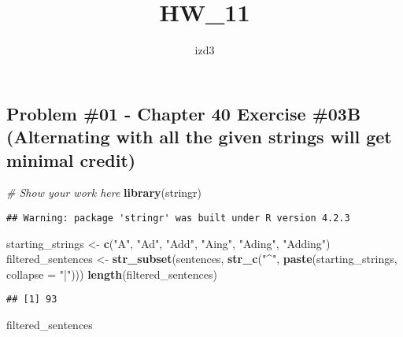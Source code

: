 \documentclass[
]{article}
\title{HW\_11}
\author{izd3}
\date{}
\newenvironment{Shaded}{\begin{snugshade}}{\end{snugshade}}
\newcommand{\AttributeTok}[1]{\textcolor[rgb]{0.13,0.29,0.53}{#1}}
\newcommand{\CommentTok}[1]{\textcolor[rgb]{0.56,0.35,0.01}{\textit{#1}}}
\newcommand{\FunctionTok}[1]{\textcolor[rgb]{0.13,0.29,0.53}{\textbf{#1}}}
\newcommand{\NormalTok}[1]{#1}
\newcommand{\OtherTok}[1]{\textcolor[rgb]{0.56,0.35,0.01}{#1}}
\newcommand{\StringTok}[1]{\textcolor[rgb]{0.31,0.60,0.02}{#1}}
\begin{document}
\maketitle

\newpage

\hypertarget{problem-01---chapter-40-exercise-03b-alternating-with-all-the-given-strings-will-get-minimal-credit}{%
\subsection{Problem \#01 - Chapter 40 Exercise \#03B (Alternating with
all the given strings will get minimal
credit)}\label{problem-01---chapter-40-exercise-03b-alternating-with-all-the-given-strings-will-get-minimal-credit}}

\begin{Shaded}
\begin{Highlighting}[]
\CommentTok{\# Show your work here}
\FunctionTok{library}\NormalTok{(stringr)}
\end{Highlighting}
\end{Shaded}

\begin{verbatim}
## Warning: package 'stringr' was built under R version 4.2.3
\end{verbatim}

\begin{Shaded}
\begin{Highlighting}[]
\NormalTok{starting\_strings }\OtherTok{\textless{}{-}} \FunctionTok{c}\NormalTok{(}\StringTok{"A"}\NormalTok{, }\StringTok{"Ad"}\NormalTok{, }\StringTok{"Add"}\NormalTok{, }\StringTok{"Aing"}\NormalTok{, }\StringTok{"Ading"}\NormalTok{, }\StringTok{"Adding"}\NormalTok{)}
\NormalTok{filtered\_sentences }\OtherTok{\textless{}{-}} \FunctionTok{str\_subset}\NormalTok{(sentences, }\FunctionTok{str\_c}\NormalTok{(}\StringTok{"\^{}"}\NormalTok{, }\FunctionTok{paste}\NormalTok{(starting\_strings, }\AttributeTok{collapse =} \StringTok{"|"}\NormalTok{)))}
\FunctionTok{length}\NormalTok{(filtered\_sentences)}
\end{Highlighting}
\end{Shaded}

\begin{verbatim}
## [1] 93
\end{verbatim}

\begin{Shaded}
\begin{Highlighting}[]
\NormalTok{filtered\_sentences}
\end{Highlighting}
\end{Shaded}
\end{document}
